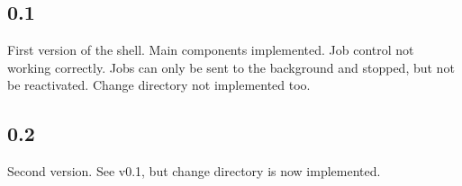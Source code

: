 \subsection{0.1}
First version of the shell. Main components implemented. Job control not working correctly. Jobs can only be sent to the background and stopped, but not be reactivated. Change directory not implemented too.

\subsection{0.2}
Second version. See v0.1, but change directory is now implemented.
